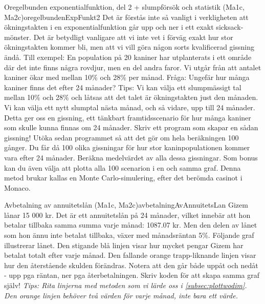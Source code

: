 \begin{matteovnings}{Oregelbunden exponentialfunktion, del 2 + slumpförsök och statistik (Ma1c, Ma2c)}{oregelbundenExpFunkt2}
Det är förstås inte så vanligt i verkligheten att ökningstakten i en exponentialfunktion går upp och ner i ett exakt sicksack-mönster. Det är betydligt vanligare att vi inte vet i förväg exakt hur stor ökningstakten kommer bli, men att vi vill göra någon sorts kvalificerad gissning ändå.
\newline
\newline
Till exempel: En population på 20 kaniner har utplanterats i ett område där det inte finns några rovdjur, men en del andra faror. Vi utgår från att antalet kaniner ökar med mellan 10\% och 28\% per månad.
\newline
\newline
Fråga: Ungefär hur många kaniner finns det efter 24 månader?
\newline
\newline
Tips: Vi kan välja ett slumpmässigt tal mellan 10\% och 28\% och låtsas att det talet är ökningstakten just den månaden. Vi kan välja ett nytt slumptal nästa månad, och så vidare, upp till 24 månader. Detta ger oss en gissning, ett tänkbart framtidsscenario för hur många kaniner som skulle kunna finnas om 24 månader. Skriv ett program som skapar en sådan gissning!
\newline
\newline
Utöka sedan programmet så att det gör om hela beräkningen 100 gånger. Du får då 100 olika gissningar för hur stor kaninpopulationen kommer vara efter 24 månader. Beräkna medelvärdet av alla dessa gissningar. Som bonus kan du även välja att plotta alla 100 scenarion i en och samma graf.
\newline
\newline
Denna metod brukar kallas en Monte Carlo-simulering, efter det berömda casinot i Monaco.
\end{matteovnings}
\newpage
\begin{matteovnings}{Avbetalning av annuitetslån (Ma1c, Ma2c)}{avbetalningAvAnnuitetsLan}
Gizem lånar 15 000 kr. Det är ett annuitetslån på 24 månader, vilket innebär att hon betalar tillbaka samma summa varje månad: 1087.07 kr. Men den delen av lånet som hon ännu inte betalat tillbaka, växer med månadsräntan 5\%. Följande graf illustrerar lånet.
Den stigande blå linjen visar hur mycket pengar Gizem har betalat totalt efter varje månad. Den fallande orange trapp-liknande linjen visar hur den återstående skulden förändras. Notera att den går både uppåt och nedåt - upp pga räntan, ner pga återbetalningen. Skriv koden för att skapa samma graf själv!
\newline
\newline
\emph{Tips: Rita linjerna med metoden som vi lärde oss i \autoref{subsec:plottwodim}. Den orange linjen behöver två värden för varje månad, inte bara ett värde.}
\end{matteovnings}

